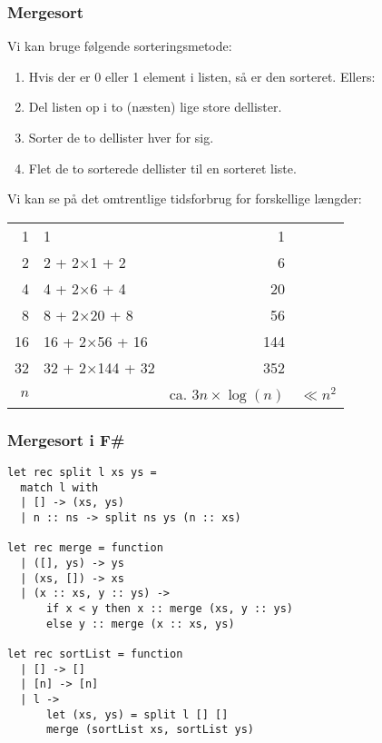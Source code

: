 \documentclass{beamer}
\begin{document}
\begin{frame}
\frametitle{Mergesort}

Vi kan bruge følgende sorteringsmetode:

\begin{enumerate}[~1.]
\item Hvis der er 0 eller 1 element i listen, så er den sorteret.  Ellers:
\item Del listen op i to (næsten) lige store dellister.
\item Sorter de to dellister hver for sig.
\item Flet de to sorterede dellister til en sorteret liste.
\end{enumerate}

\pause

\vspace{2ex}

Vi kan se på det omtrentlige tidsforbrug for forskellige længder:

\vspace{2ex}

\begin{tabular}{r@{\quad:\quad}l@{ = }rl}
1 & 1 & 1 \\
2 & 2 + 2×1 + 2 & 6 \\
4 & 4 + 2×6 + 4 & 20 \\
8 & 8 + 2×20 + 8 & 56 \\
16 & 16 + 2×56 + 16 & 144 \\
32 & 32 + 2×144 + 32 & 352 \\
$n$ && ca. $3n×\log(n)$ & $\ll n^2 $
\end{tabular}


\end{frame}

\begin{frame}[fragile=singleslide]
\frametitle{Mergesort i F\#}

{\small
\begin{verbatim}
let rec split l xs ys =
  match l with
  | [] -> (xs, ys)
  | n :: ns -> split ns ys (n :: xs)

let rec merge = function
  | ([], ys) -> ys
  | (xs, []) -> xs
  | (x :: xs, y :: ys) ->
      if x < y then x :: merge (xs, y :: ys)
      else y :: merge (x :: xs, ys)

let rec sortList = function
  | [] -> []
  | [n] -> [n]
  | l ->
      let (xs, ys) = split l [] []
      merge (sortList xs, sortList ys)
\end{verbatim}
}
\end{frame}
\end{document}
